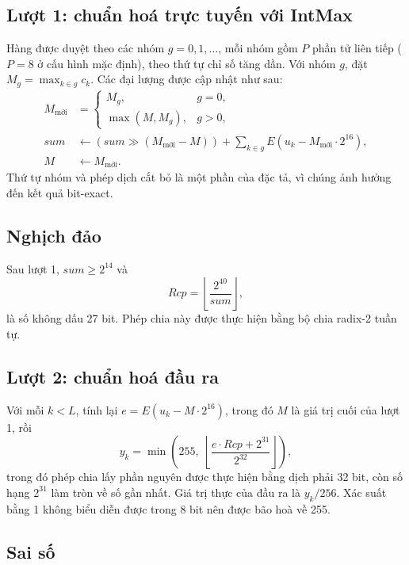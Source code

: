 \subsection{Lượt 1: chuẩn hoá trực tuyến với IntMax}

Hàng được duyệt theo các nhóm $g = 0, 1, \dots$, mỗi nhóm gồm $P$ phần tử liên tiếp ($P = 8$ ở cấu hình mặc định), theo thứ tự chỉ số tăng dần. Với nhóm $g$, đặt $M_g = \max_{k \in g} c_k$. Các đại lượng được cập nhật như sau:
\begin{align}
  M_{\text{mới}} &= \begin{cases} M_g, & g = 0, \\ \max(M, M_g), & g > 0, \end{cases} \\
  \mathit{sum} &\leftarrow \left(\mathit{sum} \gg (M_{\text{mới}} - M)\right) + \sum_{k \in g} E(u_k - M_{\text{mới}} \cdot 2^{16}), \\
  M &\leftarrow M_{\text{mới}}.
\end{align}
Thứ tự nhóm và phép dịch cắt bỏ là một phần của đặc tả, vì chúng ảnh hưởng đến kết quả bit-exact.

\subsection{Nghịch đảo}

Sau lượt 1, $\mathit{sum} \ge 2^{14}$ và
\begin{equation}
  \mathit{Rcp} = \left\lfloor \frac{2^{40}}{\mathit{sum}} \right\rfloor,
\end{equation}
là số không dấu 27 bit. Phép chia này được thực hiện bằng bộ chia radix-2 tuần tự.

\subsection{Lượt 2: chuẩn hoá đầu ra}

Với mỗi $k < L$, tính lại $e = E(u_k - M \cdot 2^{16})$, trong đó $M$ là giá trị cuối của lượt 1, rồi
\begin{equation}
  y_k = \min\left(255, \; \left\lfloor \frac{e \cdot \mathit{Rcp} + 2^{31}}{2^{32}} \right\rfloor\right),
\end{equation}
trong đó phép chia lấy phần nguyên được thực hiện bằng dịch phải 32 bit, còn số hạng $2^{31}$ làm tròn về số gần nhất. Giá trị thực của đầu ra là $y_k / 256$. Xác suất bằng 1 không biểu diễn được trong 8 bit nên được bão hoà về 255.

\subsection{Sai số}


